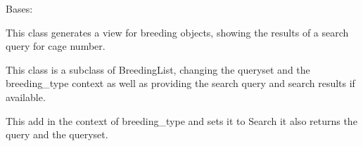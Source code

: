 \documentclass[letterpaper,10pt,english]{sphinxmanual}
\begin{document}

\begin{fulllineitems}
\label{api:mousedb.animal.views.BreedingSearch}
Bases: {\hyperref[api:mousedb.animal.views.BreedingList]{}}

This class generates a view for breeding objects, showing the results of a search query for cage number.

This class is a subclass of BreedingList, changing the queryset and the  breeding\_type context as well as providing the search query and search results if available.

\begin{fulllineitems}
\label{api:mousedb.animal.views.BreedingSearch.get_context_data}
This add in the context of breeding\_type and sets it to Search it also returns the query and the queryset.

\end{fulllineitems}


\begin{fulllineitems}
\label{api:mousedb.animal.views.BreedingSearch.template_name}
\end{fulllineitems}


\end{fulllineitems}

\end{document}
